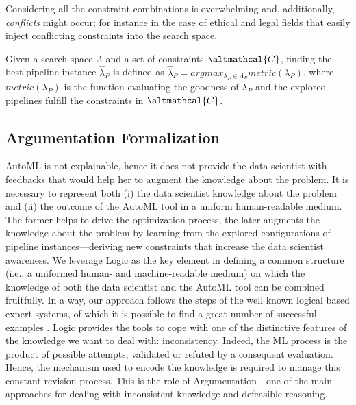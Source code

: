 Considering all the constraint combinations is overwhelming and, additionally, \emph{conflicts} might occur; for instance in the case of ethical \cite{boston-house} and legal fields that easily inject conflicting constraints into the search space.

\begin{definition}
Given a search space $\Lambda$ and a set of constraints $\altmathcal{C}$, finding the best pipeline instance $\hat{\lambda}_P$ is defined as $\hat{\lambda}_P = argmax_{\lambda_P \in \Lambda_P} metric(\lambda_P)$, where $metric(\lambda_P)$ is the function evaluating the goodness of $\lambda_P$ and the explored pipelines fulfill the constraints in $\altmathcal{C}$.
\end{definition}

\subsection{Argumentation Formalization}
\label{hamlet-ssec:argumentation-formalization}

AutoML is not explainable, hence it does not provide the data scientist with feedbacks that would help her to augment the knowledge about the problem.
It is necessary to represent both (i) the data scientist knowledge about the problem and (ii) the outcome of the AutoML tool in a uniform human-readable medium.
The former helps to drive the optimization process,
the later augments the knowledge about the problem by learning from the explored configurations of pipeline instances---deriving new constraints that increase the data scientist awareness.
We leverage Logic as the key element in defining a common structure (i.e., a uniformed human- and machine-readable medium) on which the knowledge of both the data scientist and the AutoML tool can be combined fruitfully.
In a way, our approach follows the steps of the well known logical based expert systems, of which it is possible to find a great number of successful examples \cite{tan17es}.
Logic provides the tools to cope with one of the distinctive features of the knowledge we want to deal with: inconsistency. Indeed, the ML process is the product of possible attempts, validated or refuted by a consequent evaluation. Hence, the mechanism used to encode the knowledge is required to manage this constant revision process.
This is the role of Argumentation---one of the main approaches for dealing with inconsistent knowledge and defeasible reasoning. 

